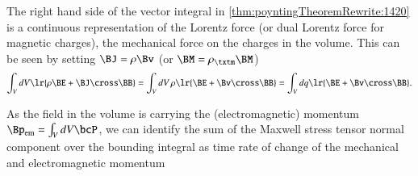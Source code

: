 The right hand side of the vector integral in \cref{thm:poyntingTheoremRewrite:1420} is a continuous representation of the Lorentz force
(or dual Lorentz force for magnetic charges),
the mechanical force on the charges in the volume.  This can be seen by setting \( \BJ = \rho \Bv \) (or \( \BM = \rho_\txtm \BM \))
\begin{dmath}\label{eqn:poyntingTheoremRewrite:1420}
\int_V dV \lr{ \rho \BE + \BJ \cross \BB }
=
\int_V dV\, \rho \lr{ \BE + \Bv \cross \BB }
=
\int_V dq \lr{ \BE + \Bv \cross \BB }.
\end{dmath}

As the field in the volume is carrying the (electromagnetic) momentum \( \Bp_{\textrm{em}} = \int_V dV \bcP \), we can identify the sum of the Maxwell stress tensor normal component over the bounding integral as time rate of change of the mechanical and electromagnetic momentum

